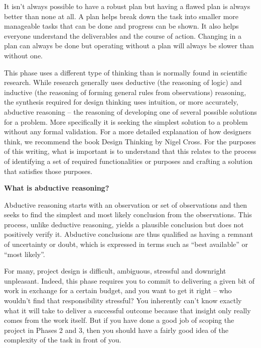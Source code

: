 \documentclass[
]{book}
\begin{document}
It isn't always possible to have a robust plan but having a flawed plan is always better than none at all. A plan helps break down the task into smaller more manageable tasks that can be done and progress can be shown. It also helps everyone understand the deliverables and the course of action. Changing in a plan can always be done but operating without a plan will always be slower than without one.

This phase uses a different type of thinking than is normally found in scientific research. While research generally uses deductive (the reasoning of logic) and inductive (the reasoning of forming general rules from observations) reasoning, the synthesis required for design thinking uses intuition, or more accurately, abductive reasoning -- the reasoning of developing one of several possible solutions for a problem. More specifically it is seeking the simplest solution to a problem without any formal validation. For a more detailed explanation of how designers think, we recommend the book Design Thinking by Nigel Cross. For the purposes of this writing, what is important is to understand that this relates to the process of identifying a set of required functionalities or purposes and crafting a solution that satisfies those purposes.

\begin{infobox}

\textbf{What is abductive reasoning?}

Abductive reasoning starts with an observation or set of observations and then seeks to find the simplest and most likely conclusion from the observations. This process, unlike deductive reasoning, yields a plausible conclusion but does not positively verify it. Abductive conclusions are thus qualified as having a remnant of uncertainty or doubt, which is expressed in terms such as ``best available'' or ``most likely''.

\end{infobox}

For many, project design is difficult, ambiguous, stressful and downright unpleasant. Indeed, this phase requires you to commit to delivering a given bit of work in exchange for a certain budget, and you want to get it right -- who wouldn't find that responsibility stressful? You inherently can't know exactly what it will take to deliver a successful outcome because that insight only really comes from the work itself. But if you have done a good job of scoping the project in Phases 2 and 3, then you should have a fairly good idea of the complexity of the task in front of you.
\end{document}
